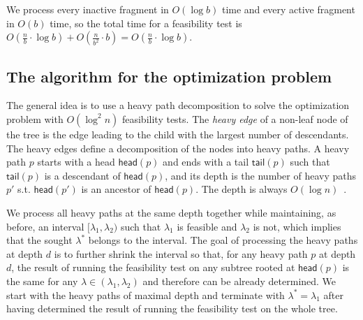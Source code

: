\documentclass[11pt,a4paper]{article}
\newcommand{\head}{\textsf{head}}
\newcommand{\tail}{\textsf{tail}}
\theoremstyle{definition}
\theoremstyle{remark}
\begin{document}
We process every inactive fragment in $O(\log b)$ time and every active fragment in $O(b)$ time, so the total time for a feasibility test is
$O(\frac{n}{b} \cdot \log b) + O(\frac{n}{b^2} \cdot b) = O(\frac{n}{b}\cdot \log b)$.

\subsection{The algorithm for the optimization problem} \label{sec:nloglogn}

The general idea is to use a heavy path decomposition to solve the optimization  problem
with $O(\log^{2}n)$ feasibility tests. The {\em heavy edge} of a non-leaf node of the tree is the edge leading to the child
with the largest number of descendants. The heavy edges define a decomposition of the nodes into heavy paths. A heavy
path $p$ starts with a head $\head(p)$ and ends with a tail $\tail(p)$ such that $\tail(p)$ is a descendant of $\head(p)$,
and its depth is the number of heavy paths $p'$ s.t. $\head(p')$ is an ancestor of $\head(p)$. The depth 
is always $O(\log n)$~\cite{Sleator1983}.

We process all heavy paths at the same depth together while maintaining, as before, an interval $[\lambda_{1},\lambda_{2})$ such that
$\lambda_{1}$ is feasible and $\lambda_{2}$ is not, which implies that the sought $\lambda^{*}$ belongs to the interval.
The goal of processing the heavy paths at depth $d$ is to further shrink the interval so that, for any heavy path $p$ at depth $d$,
the result of running the feasibility
test on any subtree rooted at $\head(p)$ is the same for any $\lambda\in(\lambda_{1},\lambda_{2})$ and therefore can
be already determined. We start with the heavy paths of maximal depth and terminate
with $\lambda^{*}=\lambda_{1}$ after having determined the result of running the feasibility test on the whole tree.
\end{document}
